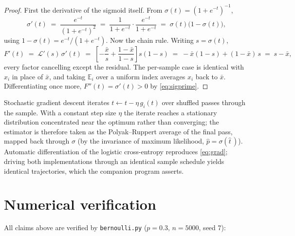 \documentclass[11pt]{article}
\theoremstyle{remark}
\newcommand{\E}{\mathbb{E}}
\newcommand{\xbar}{\bar{x}}
\newcommand{\phat}{\hat{p}}
\begin{document}
\begin{proof}
First the derivative of the sigmoid itself. From
$\sigma(t) = (1 + e^{-t})^{-1}$,
\begin{equation}
  \sigma'(t)
  \;=\; \frac{e^{-t}}{(1 + e^{-t})^{2}}
  \;=\; \frac{1}{1 + e^{-t}} \cdot \frac{e^{-t}}{1 + e^{-t}}
  \;=\; \sigma(t)\bigl(1 - \sigma(t)\bigr),
  \label{eq:sigprime}
\end{equation}
using $1 - \sigma(t) = e^{-t}/(1 + e^{-t})$. Now the chain rule.
Writing $s = \sigma(t)$,
\begin{equation*}
  F'(t)
  \;=\; \mathcal{L}'(s)\,\sigma'(t)
  \;=\; \left[-\frac{\xbar}{s} + \frac{1-\xbar}{1-s}\right]
        s(1-s)
  \;=\; -\xbar(1-s) + (1-\xbar)\,s
  \;=\; s - \xbar,
\end{equation*}
every factor cancelling except the residual. The per-sample case is
identical with $x_i$ in place of $\xbar$, and taking
$\E_i$ over a uniform index averages $x_i$ back to $\xbar$.
Differentiating once more, $F''(t) = \sigma'(t) > 0$ by
\eqref{eq:sigprime}.
\end{proof}

Stochastic gradient descent iterates
$t \leftarrow t - \eta\, g_i(t)$ over shuffled passes through the
sample. With a constant step size $\eta$ the iterate reaches a
stationary distribution concentrated near the optimum rather than
converging; the estimator is therefore taken as the
Polyak--Ruppert average of the final pass, mapped back through
$\sigma$ (by the invariance of maximum likelihood,
$\phat = \sigma(\hat t\,)$). Automatic differentiation of the
logistic cross-entropy reproduces \eqref{eq:grad}; driving both
implementations through an identical sample schedule yields
identical trajectories, which the companion program asserts.

\section{Numerical verification}

All claims above are verified by \texttt{bernoulli.py}
($p = 0.3$, $n = 5000$, seed 7):
\end{document}
